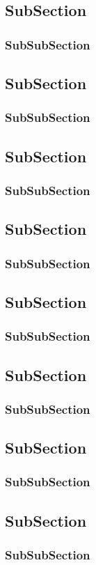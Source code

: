\subsection{SubSection}
\subsubsection{SubSubSection}

\subsection{SubSection}
\subsubsection{SubSubSection}

\subsection{SubSection}
\subsubsection{SubSubSection}

\subsection{SubSection}
\subsubsection{SubSubSection}

\subsection{SubSection}
\subsubsection{SubSubSection}

\subsection{SubSection}
\subsubsection{SubSubSection}

\subsection{SubSection}
\subsubsection{SubSubSection}

\subsection{SubSection}
\subsubsection{SubSubSection}

